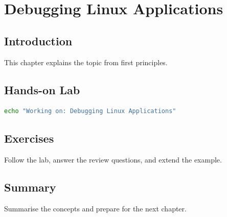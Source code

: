 \chapter{Debugging Linux Applications}
\label{chap:vol2-11}



\section{Introduction}
This chapter explains the topic from first principles.

\section{Hands-on Lab}
\begin{lstlisting}[language=bash]
echo "Working on: Debugging Linux Applications"
\end{lstlisting}

\section{Exercises}
\begin{exercise}
Follow the lab, answer the review questions, and extend the example.
\end{exercise}

\section{Summary}
Summarise the concepts and prepare for the next chapter.
